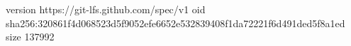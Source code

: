version https://git-lfs.github.com/spec/v1
oid sha256:320861f4d068523d5f9052efe6652e532839408f1da72221f6d491ded5f8a1ed
size 137992
